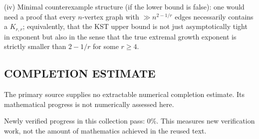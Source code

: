 (iv) Minimal counterexample structure (if the lower bound is false): one would need a proof that every $n$-vertex graph with $\gg n^{2-1/r}$ edges necessarily contains a $K_{r,r}$; equivalently, that the KST upper bound is not just asymptotically tight in exponent but also in the sense that the true extremal growth exponent is strictly smaller than $2-1/r$ for some $r\ge 4$.




\subsection*{COMPLETION ESTIMATE}
The primary source supplies no extractable numerical completion estimate. Its mathematical progress is not numerically assessed here.

Newly verified progress in this collection pass: $0\%$. This measures new verification work, not the amount of mathematics achieved in the reused text.
